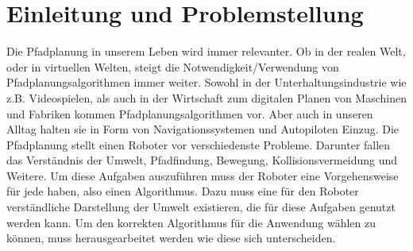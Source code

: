 
\chapter{Einleitung und Problemstellung}

Die Pfadplanung in unserem Leben wird immer relevanter. Ob in der realen Welt, oder in virtuellen Welten, steigt die Notwendigkeit/Verwendung von Pfadplanungsalgorithmen immer weiter. Sowohl in der Unterhaltungsindustrie wie z.B. Videospielen, als auch in der Wirtschaft zum digitalen Planen von Maschinen und Fabriken kommen Pfadplanungsalgorithmen vor. Aber auch in unseren Alltag halten sie in Form von Navigationssystemen und Autopiloten Einzug. Die Pfadplanung stellt einen Roboter vor verschiedenste Probleme. Darunter fallen das Verständnis der Umwelt, Pfadfindung, Bewegung, Kollisionsvermeidung und Weitere. Um diese Aufgaben auszuführen muss der Roboter eine Vorgehensweise für jede haben, also einen Algorithmus. Dazu muss eine für den Roboter verständliche Darstellung der Umwelt existieren, die für diese Aufgaben genutzt werden kann. Um den korrekten Algorithmus für die Anwendung wählen zu können, muss herausgearbeitet werden wie diese sich unterscheiden. 
